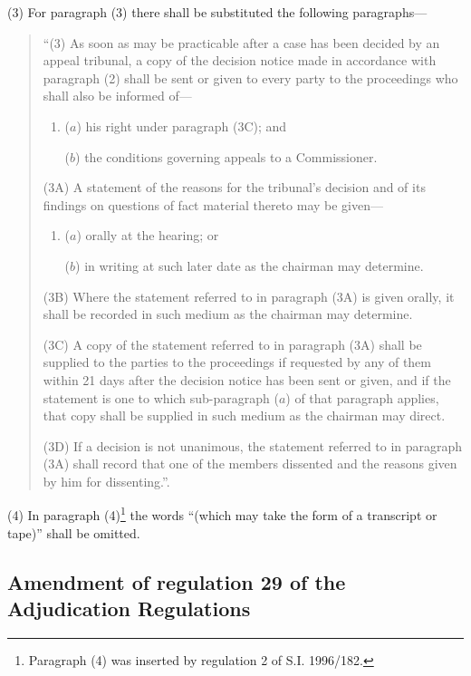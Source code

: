 \documentclass[a4paper]{article}
\begin{document}
(3) For paragraph (3) there shall be substituted the following paragraphs—
\begin{quotation}
“(3) As soon as may be practicable after a case has been decided by an appeal tribunal, a copy of the decision notice made in accordance with paragraph (2) shall be sent or given to every party to the proceedings who shall also be informed of—
\begin{enumerate}\item[]
($a$) his right under paragraph (3C); and

($b$) the conditions governing appeals to a Commissioner.
\end{enumerate}

(3A) A statement of the reasons for the tribunal’s decision and of its findings on questions of fact material thereto may be given—
\begin{enumerate}\item[]
($a$) orally at the hearing; or

($b$) in writing at such later date as the chairman may determine.
\end{enumerate}

(3B) Where the statement referred to in paragraph (3A) is given orally, it shall be recorded in such medium as the chairman may determine.

(3C) A copy of the statement referred to in paragraph (3A) shall be supplied to the parties to the proceedings if requested by any of them within 21 days after the decision notice has been sent or given, and if the statement is one to which sub-paragraph ($a$) of that paragraph applies, that copy shall be supplied in such medium as the chairman may direct.

(3D) If a decision is not unanimous, the statement referred to in paragraph (3A) shall record that one of the members dissented and the reasons given by him for dissenting.”.
\end{quotation}

(4) In paragraph (4)\footnote{\frenchspacing Paragraph (4) was inserted by regulation 2 of S.I. 1996/182.} the words “(which may take the form of a transcript or tape)” shall be omitted.

\subsection[12. Amendment of regulation 29 of the Adjudication Regulations]{Amendment of regulation 29 of the Adjudication Regulations}
\end{document}
